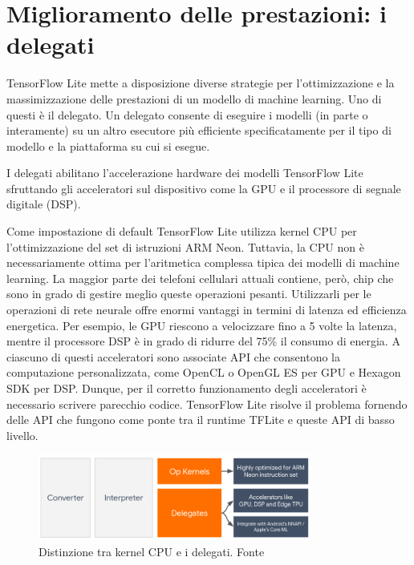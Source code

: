 \section{Miglioramento delle prestazioni: i delegati}
TensorFlow Lite mette a disposizione diverse strategie per l’ottimizzazione e la massimizzazione delle prestazioni di un modello di machine learning.
Uno di questi è il delegato. Un delegato consente di eseguire i modelli (in parte o interamente) su un altro esecutore più efficiente specificatamente
per il tipo di modello e la piattaforma su cui si esegue.                                                                                                                                       

I delegati abilitano l'accelerazione hardware dei modelli TensorFlow Lite sfruttando gli acceleratori sul dispositivo come la GPU e il processore di
segnale digitale (DSP).

Come impostazione di default TensorFlow Lite utilizza kernel CPU per l’ottimizzazione del set di istruzioni ARM Neon. Tuttavia, la CPU non è
necessariamente ottima per l'aritmetica complessa tipica dei modelli di machine learning. La maggior parte dei telefoni cellulari attuali contiene,
però, chip che sono in grado di gestire meglio queste operazioni pesanti. Utilizzarli per le operazioni di rete neurale offre enormi vantaggi in termini
di latenza ed efficienza energetica. Per esempio, le GPU riescono a velocizzare fino a 5 volte la latenza, mentre il processore DSP è in grado di ridurre
del 75\% il consumo di energia. A ciascuno di questi acceleratori sono associate API che consentono la computazione personalizzata, come OpenCL o OpenGL
ES per GPU e Hexagon SDK per DSP. Dunque, per il corretto funzionamento degli acceleratori è necessario scrivere parecchio codice. TensorFlow Lite risolve
il problema fornendo delle API che fungono come ponte tra il runtime TFLite e queste API di basso livello.

\begin{figure}[ht]
    \centering
    \includegraphics[width=0.8\textwidth]{Immagini/delegate_runtime.png}
    \caption{Distinzione tra kernel CPU e i delegati. Fonte}
    \label{fig:distinzione}
\end{figure}

